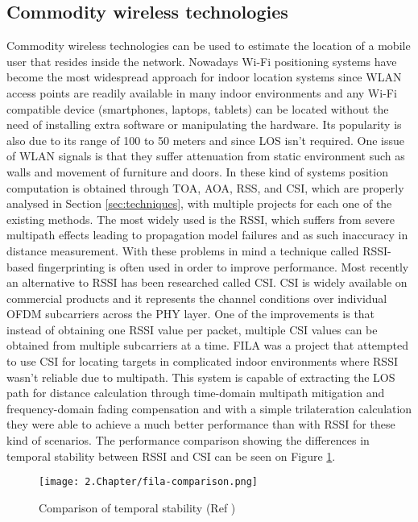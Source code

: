   
\subsection{Commodity wireless technologies}  
\label{subsec:wifi}  
  
  
Commodity wireless technologies can be used to estimate the location of a mobile user that resides inside the network. Nowadays Wi-Fi positioning systems have become the most widespread approach for indoor location systems since \ac{WLAN} access points are readily available in many indoor environments and any Wi-Fi compatible device (smartphones, laptops, tablets) can be located without the need of installing extra software or manipulating the hardware. Its popularity is also due to its range of 100 to 50 meters and since \ac{LOS} isn't required. One issue of \ac{WLAN} signals is that they suffer attenuation from static environment such as walls and movement of furniture and doors. In these kind of systems position computation is obtained through TOA, AOA, RSS, and CSI, which are properly analysed in Section \ref{sec:techniques}, with multiple projects for each one of the existing methods. The most widely used is the \ac{RSSI}, which suffers from severe multipath effects leading to propagation model failures and as such inaccuracy in distance measurement. With these problems in mind a technique called RSSI-based fingerprinting is often used in order to improve performance.  
Most recently an alternative to RSSI has been researched called \ac{CSI}. \ac{CSI} is widely available on commercial products and it represents the channel conditions over individual OFDM subcarriers across the \ac{PHY} layer. One of the improvements is that instead of obtaining one \ac{RSSI} value per packet, multiple \ac{CSI} values can be obtained from multiple subcarriers at a time. FILA \cite{fila} was a project that attempted to use \ac{CSI} for locating targets in complicated indoor environments where RSSI wasn't reliable due to multipath. This system is capable of extracting the \ac{LOS} path for distance calculation through time-domain multipath mitigation and frequency-domain fading compensation and with a simple trilateration calculation they were able to achieve a much better performance than with \ac{RSSI} for these kind of scenarios. The performance comparison showing the differences in temporal stability between \ac{RSSI} and \ac{CSI} can be seen on Figure \ref{fig:fila}.  
  
  
\begin{figure}[H]  
\centering  
\texttt{[image: 2.Chapter/fila-comparison.png]}  
\caption[Comparison of temporal stability (Ref \cite{fila}) ]{Comparison of temporal stability (Ref \cite{fila})}  
\label{fig:fila}  
\end{figure}  
  
